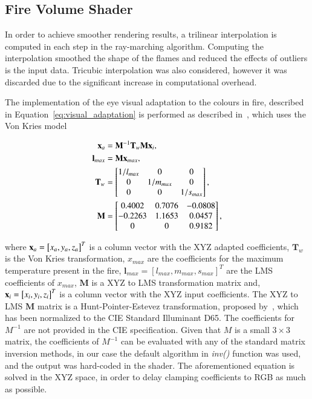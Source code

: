 \subsection{Fire Volume Shader}
\label{sec:fire_volume_shader}

In order to achieve smoother rendering results, a trilinear interpolation is computed in each step in the ray-marching algorithm.
Computing the interpolation smoothed the shape of the flames and reduced the effects of outliers is the input data.
Tricubic interpolation was also considered, however it was discarded due to the significant increase in computational overhead.

The implementation of the eye visual adaptation to the colours in fire, described in Equation~\ref{eq:visual_adaptation} is performed as described in~\cite{Nguyen:2002}, which uses the Von Kries model~\cite{Fairchild:2005} 

\begin{equation}
\begin{split}
\mathbf{x}_a &= \mathbf{M}^{-1} \mathbf{T}_w \mathbf{M} \mathbf{x}_i, \\
\mathbf{l}_{max} &= \mathbf{M} \mathbf{x}_{max}, \\
\mathbf{T}_w &= 
\begin{bmatrix}
1 / l_{max} & 0 & 0\\
0 & 1 / m_{max} & 0\\
0 & 0 & 1 / s_{max}\\
\end{bmatrix}, \\
\mathbf{M} &= 
\begin{bmatrix}
0.4002 & 0.7076 & -0.0808\\
-0.2263 & 1.1653 & 0.0457\\
0 & 0 & 0.9182\\
\end{bmatrix},
\end{split}
\end{equation}

where $\mathbf{x}_a = \left[ x_a, y_a, z_a \right]^{T}$ is a column vector with the XYZ adapted coefficients, $\mathbf{T}_w$ is the Von Kries transformation, $x_{max}$ are the coefficients for the maximum temperature present in the fire,  $\mathbf{l}_{max} = \left[ l_{max}, m_{max}, s_{max} \right]^{T}$ are the LMS coefficients of $x_{max}$, $\mathbf{M}$ is a XYZ to LMS transformation matrix and, $\mathbf{x}_i = \left[ x_i, y_i, z_i \right]^{T}$ is a column vector with the XYZ input coefficients.
The XYZ to LMS $\mathbf{M}$ matrix is a Hunt-Pointer-Estevez transformation, proposed by~\cite{Hunt:1985}, which has been normalized to the CIE Standard Illuminant D65.
The coefficients for $M^{-1}$ are not provided in the CIE specification.
Given that $M$ is a small $3 \times 3$ matrix, the coefficients of $M^{-1}$ can be evaluated with any of the standard matrix inversion methods, in our case the default algorithm in \Matlab \textit{inv()} function was used, and the output was hard-coded in the shader.
The aforementioned equation is solved in the XYZ space, in order to delay clamping coefficients to RGB as much as possible.

